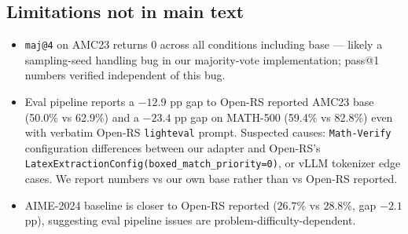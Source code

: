 \subsection{Limitations not in main text}
\begin{itemize}\itemsep0pt
\item \texttt{maj@4} on AMC23 returns 0 across all conditions including base --- likely
a sampling-seed handling bug in our majority-vote implementation; pass@1 numbers
verified independent of this bug.
\item Eval pipeline reports a $-12.9$ pp gap to Open-RS reported AMC23 base
(50.0\% vs 62.9\%) and a $-23.4$ pp gap on MATH-500 (59.4\% vs 82.8\%) even with
verbatim Open-RS \texttt{lighteval} prompt. Suspected causes: \texttt{Math-Verify}
configuration differences between our adapter and Open-RS's
\texttt{LatexExtractionConfig(boxed\_match\_priority=0)}, or vLLM tokenizer edge
cases. We report numbers vs our own base rather than vs Open-RS reported.
\item AIME-2024 baseline is closer to Open-RS reported ($26.7$\% vs $28.8$\%, gap
$-2.1$ pp), suggesting eval pipeline issues are problem-difficulty-dependent.
\end{itemize}

